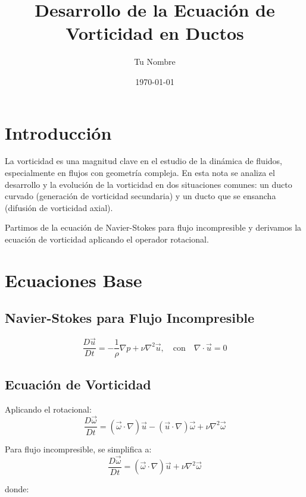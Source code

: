 \documentclass{article}
\title{Desarrollo de la Ecuación de Vorticidad en Ductos}
\author{Tu Nombre}
\date{\today}
\begin{document}
\maketitle

\section{Introducción}

La vorticidad es una magnitud clave en el estudio de la dinámica de fluidos, especialmente en flujos con geometría compleja. En esta nota se analiza el desarrollo y la evolución de la vorticidad en dos situaciones comunes: un ducto curvado (generación de vorticidad secundaria) y un ducto que se ensancha (difusión de vorticidad axial).

\vspace{1em}
Partimos de la ecuación de Navier-Stokes para flujo incompresible y derivamos la ecuación de vorticidad aplicando el operador rotacional.

\section{Ecuaciones Base}

\subsection{Navier-Stokes para Flujo Incompresible}
\begin{equation}
    \frac{D\vec{u}}{Dt} = -\frac{1}{\rho}\nabla p + \nu \nabla^2 \vec{u}, \quad \text{con} \quad \nabla \cdot \vec{u} = 0
\end{equation}

\subsection{Ecuación de Vorticidad}
Aplicando el rotacional:
\begin{equation}
    \frac{D\vec{\omega}}{Dt} = (\vec{\omega} \cdot \nabla)\vec{u} - (\vec{u} \cdot \nabla)\vec{\omega} + \nu \nabla^2 \vec{\omega}
\end{equation}

Para flujo incompresible, se simplifica a:
\begin{equation}
    \frac{D\vec{\omega}}{Dt} = (\vec{\omega} \cdot \nabla)\vec{u} + \nu \nabla^2 \vec{\omega}
\end{equation}


donde:
\end{document}
